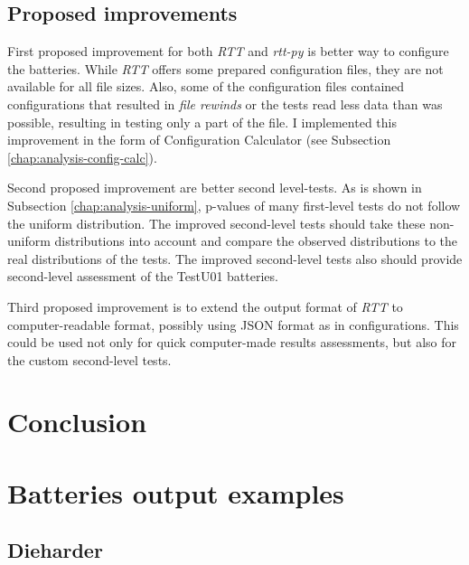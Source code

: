 \documentclass[
  digital,     %
  oneside,     %
  nosansbold,  %
  nocolorbold, %
  nolof,         %
  nolot,         %
]{fithesis4}
\begin{document}
\section{Proposed improvements}
First proposed improvement for both \emph{RTT} and \emph{rtt-py} is better way to configure the batteries. While \emph{RTT} offers some prepared configuration files, they are not available for all file sizes. Also, some of the configuration files contained configurations that resulted in \emph{file rewinds} or the tests read less data than was possible, resulting in testing only a part of the file. I implemented this improvement in the form of Configuration Calculator (see Subsection \ref{chap:analysis-config-calc}).

Second proposed improvement are better second level-tests. As is shown in Subsection \ref{chap:analysis-uniform}, p-values of many first-level tests do not follow the uniform distribution. The improved second-level tests should take these non-uniform distributions into account and compare the observed distributions to the real distributions of the tests. The improved second-level tests also should provide second-level assessment of the TestU01 batteries.

Third proposed improvement is to extend the output format of \emph{RTT} to computer-readable format, possibly using JSON format as in configurations. This could be used not only for quick computer-made results assessments, but also for the custom second-level tests.


\chapter{Conclusion}







\appendix 

\chapter{Batteries output examples} \label{append:dieharder-output}
\section{Dieharder}
\end{document}
